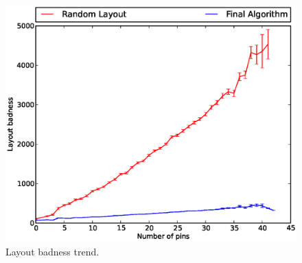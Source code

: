 \begin{figure}
\begin{center}
\includegraphics[width=\textwidth]{Images/final_algorithm_badness_trend.eps}
\caption[Combined algorithm layout badness trend]{Layout badness trend.}
\label{fig:final_badness_trend}
\end{center}
\end{figure}
